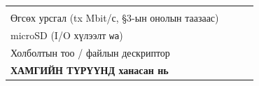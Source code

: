 \begin{longtable}[]{@{}llll@{}}
\begin{minipage}[t]{0.22\columnwidth}
\strut
\end{minipage}\tabularnewline
\begin{minipage}[t]{0.22\columnwidth}\raggedright
Өгсөх урсгал (tx Mbit/с, §3-ын онолын таазаас)\strut
\end{minipage} & \begin{minipage}[t]{0.22\columnwidth}\raggedright
\strut
\end{minipage} & \begin{minipage}[t]{0.22\columnwidth}\raggedright
\strut
\end{minipage} & \begin{minipage}[t]{0.22\columnwidth}\raggedright
\strut
\end{minipage}\tabularnewline
\begin{minipage}[t]{0.22\columnwidth}\raggedright
microSD (I/O хүлээлт \texttt{wa})\strut
\end{minipage} & \begin{minipage}[t]{0.22\columnwidth}\raggedright
\strut
\end{minipage} & \begin{minipage}[t]{0.22\columnwidth}\raggedright
\strut
\end{minipage} & \begin{minipage}[t]{0.22\columnwidth}\raggedright
\strut
\end{minipage}\tabularnewline
\begin{minipage}[t]{0.22\columnwidth}\raggedright
Холболтын тоо / файлын дескриптор\strut
\end{minipage} & \begin{minipage}[t]{0.22\columnwidth}\raggedright
\strut
\end{minipage} & \begin{minipage}[t]{0.22\columnwidth}\raggedright
\strut
\end{minipage} & \begin{minipage}[t]{0.22\columnwidth}\raggedright
\strut
\end{minipage}\tabularnewline
\begin{minipage}[t]{0.22\columnwidth}\raggedright
\textbf{ХАМГИЙН ТҮРҮҮНД ханасан нь}\strut
\end{minipage} & \begin{minipage}[t]{0.22\columnwidth}\raggedright
\strut
\end{minipage} & \begin{minipage}[t]{0.22\columnwidth}\raggedright
\strut
\end{minipage} & \begin{minipage}[t]{0.22\columnwidth}\raggedright
\strut
\end{minipage}\tabularnewline
\bottomrule
\end{longtable}\endgroup

